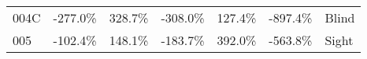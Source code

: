 \begin{table}[!htb]
\begin{tabular}{lrrrrrl}
004C        &   -277.0\% &   328.7\% &                                              -308.0\% &                                                127.4\% &  -897.4\% &                                                      Blind \\
005         &   -102.4\% &   148.1\% &                                              -183.7\% &                                                392.0\% &  -563.8\% &                                                      Sight \\
\bottomrule
\end{tabular}
\end{table}

